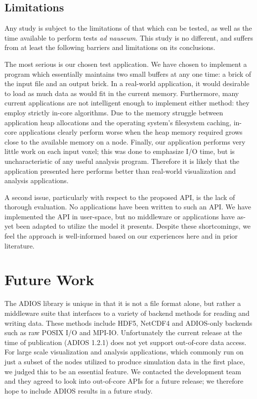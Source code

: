 \subsection{Limitations}\label{sec:issues}

Any study is subject to the limitations of that which can be tested, as
well as the time available to perform tests \textit{ad nauseum}.  This
study is no different, and suffers from at least the following barriers
and limitations on its conclusions.

The most serious is our chosen test application.  We have chosen to
implement a program which essentially maintains two small buffers
at any one time: a brick of the input file and an output brick.
In a real-world application, it would desirable to load as much
data as would fit in the current memory.  Furthermore, many current
applications are not intelligent enough to implement either method:
they employ strictly in-core algorithms.  Due to the memory struggle
between application heap allocations and the operating system's
filesystem caching, in-core applications clearly perform worse when the
heap memory required grows close to the available memory on a node.
Finally, our application performs very little work on each input voxel;
this was done to emphasize I/O time, but is uncharacteristic of any
useful analysis program.
Therefore it is likely that the application presented here performs
better than real-world visualization and analysis applications.

A second issue, particularly with respect to the proposed API, is
the lack of thorough evaluation.  No applications have been written
to such an API.  We have implemented the API in user-space, but no
middleware or applications have as-yet been adapted to utilize the
model it presents.  Despite these shortcomings, we feel the approach is
well-informed based on our experiences here and in prior literature.

\section{Future Work}

The ADIOS library is unique in that it is not a file format alone,
but rather a middleware suite that interfaces to a variety of backend
methods for reading and writing data.  These methods include HDF5,
NetCDF4 and ADIOS-only backends such as raw POSIX I/O and MPI-IO.
Unfortunately the current release at the time of publication (ADIOS
1.2.1) does not yet support out-of-core data access.  For large scale
visualization and analysis applications, which commonly run on just a
subset of the nodes utilized to produce simulation data in the first
place, we judged this to be an essential feature.  We contacted the
development team and they agreed to look into out-of-core APIs for a
future release; we therefore hope to include ADIOS results in a future
study.

